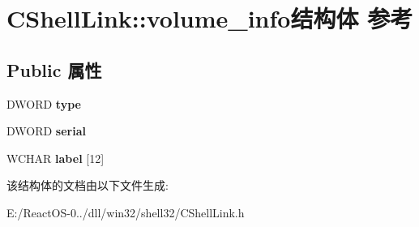 \hypertarget{struct_c_shell_link_1_1volume__info}{}\section{C\+Shell\+Link\+:\+:volume\+\_\+info结构体 参考}
\label{struct_c_shell_link_1_1volume__info}
\subsection*{Public 属性}
\begin{DoxyCompactItemize}
\item 
\mbox{\label{struct_c_shell_link_1_1volume__info_aba1e53628c26c9914c3bee6f94daac57}} 
D\+W\+O\+RD {\bfseries type}
\item 
\mbox{\label{struct_c_shell_link_1_1volume__info_a347a48ad46cc45575fa4375339350879}} 
D\+W\+O\+RD {\bfseries serial}
\item 
\mbox{\label{struct_c_shell_link_1_1volume__info_ab2b56f07c8f932af247027b26cdc5c92}} 
W\+C\+H\+AR {\bfseries label} \mbox{[}12\mbox{]}
\end{DoxyCompactItemize}


该结构体的文档由以下文件生成\+:\begin{DoxyCompactItemize}
\item 
E\+:/\+React\+O\+S-\/0../dll/win32/shell32/C\+Shell\+Link.\+h\end{DoxyCompactItemize}
